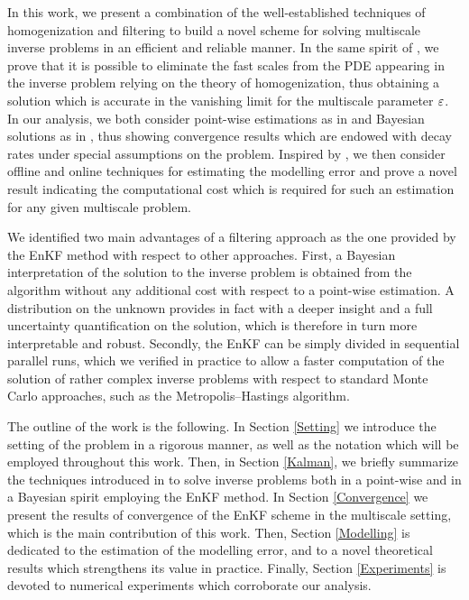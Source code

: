 \documentclass[10pt]{article}
\begin{document}
In this work, we present a combination of the well-established techniques of homogenization and filtering to build a novel scheme for solving multiscale inverse problems in an efficient and reliable manner. In the same spirit of \cite{AbD17, AbD18}, we prove that it is possible to eliminate the fast scales from the PDE appearing in the inverse problem relying on the theory of homogenization, thus obtaining a solution which is accurate in the vanishing limit for the multiscale parameter $\varepsilon$. In our analysis, we both consider point-wise estimations as in \cite{ILS13} and Bayesian solutions as in \cite{ScS17}, thus showing convergence results which are endowed with decay rates under special assumptions on the problem. Inspired by \cite{CES14, CDS18, AbD18}, we then consider offline and online techniques for estimating the modelling error and prove a novel result indicating the computational cost which is required for such an estimation for any given multiscale problem.

We identified two main advantages of a filtering approach as the one provided by the EnKF method with respect to other approaches. First, a Bayesian interpretation of the solution to the inverse problem is obtained from the algorithm without any additional cost with respect to a point-wise estimation. A distribution on the unknown provides in fact with a deeper insight and a full uncertainty quantification on the solution, which is therefore in turn more interpretable and robust. Secondly, the EnKF can be simply divided in sequential parallel runs, which we verified in practice to allow a faster computation of the solution of rather complex inverse problems with respect to standard Monte Carlo approaches, such as the Metropolis--Hastings algorithm.

The outline of the work is the following. In Section \ref{Setting} we introduce the setting of the problem in a rigorous manner, as well as the notation which will be employed throughout this work. Then, in Section \ref{Kalman}, we briefly summarize the techniques introduced in \cite{ILS13, ScS17} to solve inverse problems both in a point-wise and in a Bayesian spirit employing the EnKF method. In Section \ref{Convergence} we present the results of convergence of the EnKF scheme in the multiscale setting, which is the main contribution of this work. Then, Section \ref{Modelling} is dedicated to the estimation of the modelling error, and to a novel theoretical results which strengthens its value in practice. Finally, Section \ref{Experiments} is devoted to numerical experiments which corroborate our analysis.
\end{document}
